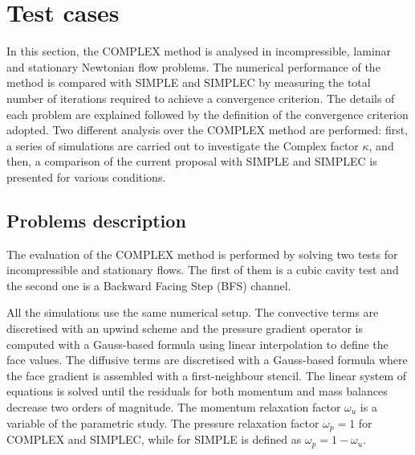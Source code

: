 \documentclass[final,3p,times,11pt,onecolumn]{myElsarticle}
\numberwithin{equation}{section}
\begin{document}
\section{Test cases}
\label{sec:cases}

In this section, the COMPLEX method is analysed in incompressible, laminar and stationary Newtonian flow problems. The numerical performance of the method is compared with SIMPLE and SIMPLEC by measuring the total number of iterations required to achieve a convergence criterion. The details of each problem are explained followed by the definition of the convergence criterion adopted. Two different analysis over the COMPLEX method are performed: first, a series of simulations are carried out to investigate the Complex factor $\kappa$, and then, a comparison of the current proposal with SIMPLE and SIMPLEC is presented for various conditions. 

\subsection{Problems description}\label{Section:problemDescription}
 The evaluation of the COMPLEX method is performed by solving two tests for incompressible and stationary flows. The first of them is a cubic cavity test and the second one is a Backward Facing Step (BFS) channel.

All the simulations use the same numerical setup. The convective terms are discretised with an upwind scheme and the pressure gradient operator is computed with a Gauss-based formula using linear interpolation to define the face values. The diffusive terms are discretised with a Gauss-based formula where the face gradient is assembled with a first-neighbour stencil. The linear system of equations is solved until the residuals for both momentum and mass balances decrease two orders of magnitude. The momentum relaxation factor $\omega_u$ is a variable of the parametric study. The pressure relaxation factor $\omega_p = 1$ for COMPLEX and SIMPLEC, while for SIMPLE is defined as $\omega_p = 1 - \omega_u$.
\end{document}
